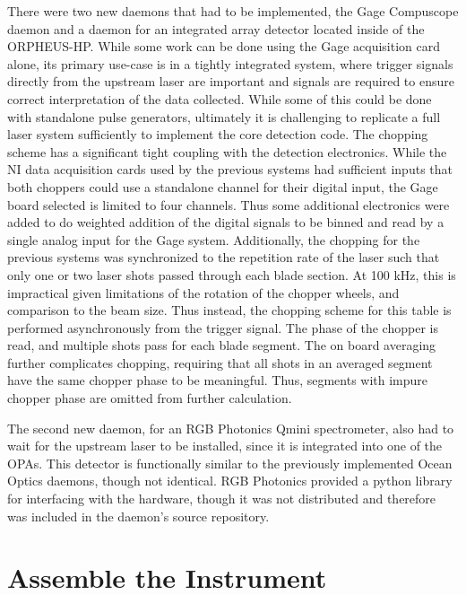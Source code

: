 There were two new daemons that had to be implemented, the Gage Compuscope daemon and a daemon for an integrated array detector located inside of the ORPHEUS-HP.
While some work can be done using the Gage acquisition card alone, its primary use-case is in a tightly integrated system, where trigger signals directly from the upstream laser are important and signals are required to ensure correct interpretation of the data collected.
While some of this could be done with standalone pulse generators, ultimately it is challenging to replicate a full laser system sufficiently to implement the core detection code.
The chopping scheme has a significant tight coupling with the detection electronics.
While the NI data acquisition cards used by the previous systems had sufficient inputs that both choppers could use a standalone channel for their digital input, the Gage board selected is limited to four channels.
Thus some additional electronics were added to do weighted addition of the digital signals to be binned and read by a single analog input for the Gage system.
Additionally, the chopping for the previous systems was synchronized to the repetition rate of the laser such that only one or two laser shots passed through each blade section.
At 100 kHz, this is impractical given limitations of the rotation of the chopper wheels, and comparison to the beam size.
Thus instead, the chopping scheme for this table is performed asynchronously from the trigger signal.
The phase of the chopper is read, and multiple shots pass for each blade segment.
The on board averaging further complicates chopping, requiring that all shots in an averaged segment have the same chopper phase to be meaningful.
Thus, segments with impure chopper phase are omitted from further calculation.


The second new daemon, for an RGB Photonics Qmini spectrometer\cite{}, also had to wait for the upstream laser to be installed, since it is integrated into one of the OPAs.
This detector is functionally similar to the previously implemented Ocean Optics daemons\cite{}, though not identical.
RGB Photonics provided a python library for interfacing with the hardware, though it was not distributed and therefore was included in the daemon's source repository.

\clearpage

\section{Assemble the Instrument}  %

